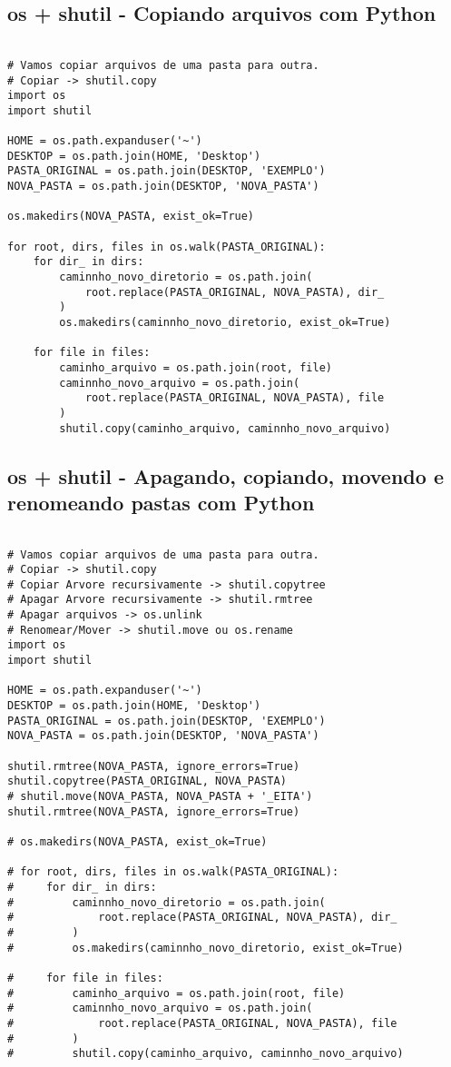 \documentclass{article}
\begin{document}
\subsection{ os + shutil - Copiando arquivos com Python}
\begin{lstlisting}
    
# Vamos copiar arquivos de uma pasta para outra.
# Copiar -> shutil.copy
import os
import shutil

HOME = os.path.expanduser('~')
DESKTOP = os.path.join(HOME, 'Desktop')
PASTA_ORIGINAL = os.path.join(DESKTOP, 'EXEMPLO')
NOVA_PASTA = os.path.join(DESKTOP, 'NOVA_PASTA')

os.makedirs(NOVA_PASTA, exist_ok=True)

for root, dirs, files in os.walk(PASTA_ORIGINAL):
    for dir_ in dirs:
        caminnho_novo_diretorio = os.path.join(
            root.replace(PASTA_ORIGINAL, NOVA_PASTA), dir_
        )
        os.makedirs(caminnho_novo_diretorio, exist_ok=True)

    for file in files:
        caminho_arquivo = os.path.join(root, file)
        caminnho_novo_arquivo = os.path.join(
            root.replace(PASTA_ORIGINAL, NOVA_PASTA), file
        )
        shutil.copy(caminho_arquivo, caminnho_novo_arquivo)
\end{lstlisting}

\subsection{ os + shutil - Apagando, copiando, movendo e renomeando pastas com Python}
\begin{lstlisting}
    
# Vamos copiar arquivos de uma pasta para outra.
# Copiar -> shutil.copy
# Copiar Arvore recursivamente -> shutil.copytree
# Apagar Arvore recursivamente -> shutil.rmtree
# Apagar arquivos -> os.unlink
# Renomear/Mover -> shutil.move ou os.rename
import os
import shutil

HOME = os.path.expanduser('~')
DESKTOP = os.path.join(HOME, 'Desktop')
PASTA_ORIGINAL = os.path.join(DESKTOP, 'EXEMPLO')
NOVA_PASTA = os.path.join(DESKTOP, 'NOVA_PASTA')

shutil.rmtree(NOVA_PASTA, ignore_errors=True)
shutil.copytree(PASTA_ORIGINAL, NOVA_PASTA)
# shutil.move(NOVA_PASTA, NOVA_PASTA + '_EITA')
shutil.rmtree(NOVA_PASTA, ignore_errors=True)

# os.makedirs(NOVA_PASTA, exist_ok=True)

# for root, dirs, files in os.walk(PASTA_ORIGINAL):
#     for dir_ in dirs:
#         caminnho_novo_diretorio = os.path.join(
#             root.replace(PASTA_ORIGINAL, NOVA_PASTA), dir_
#         )
#         os.makedirs(caminnho_novo_diretorio, exist_ok=True)

#     for file in files:
#         caminho_arquivo = os.path.join(root, file)
#         caminnho_novo_arquivo = os.path.join(
#             root.replace(PASTA_ORIGINAL, NOVA_PASTA), file
#         )
#         shutil.copy(caminho_arquivo, caminnho_novo_arquivo)
\end{lstlisting}
\end{document}
